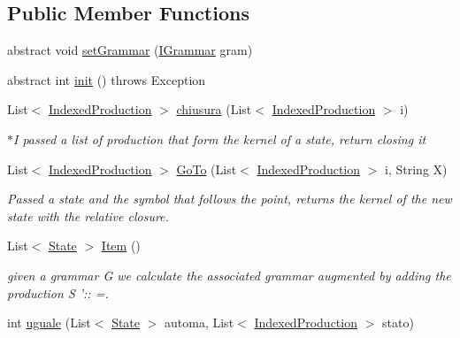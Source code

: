 \subsection*{Public Member Functions}
\begin{DoxyCompactItemize}
\item 
abstract void \hyperlink{classcontext_free_1_1parser_1_1_l_r0_ab87079bb387c26bad40d3678e80eefc9}{set\-Grammar} (\hyperlink{interfacecontext_free_1_1grammar_1_1_i_grammar}{I\-Grammar} gram)
\item 
abstract int \hyperlink{classcontext_free_1_1parser_1_1_l_r0_a1936c0d9c7c80de80a5b3913f8f710b7}{init} ()  throws Exception
\item 
List$<$ \hyperlink{classcontext_free_1_1parser_1_1_indexed_production}{Indexed\-Production} $>$ \hyperlink{classcontext_free_1_1parser_1_1_l_r0_aa0e8369b6e2db7489437ad8a6f217d22}{chiusura} (List$<$ \hyperlink{classcontext_free_1_1parser_1_1_indexed_production}{Indexed\-Production} $>$ i)
\begin{DoxyCompactList}\small\item\em $\ast$\-I passed a list of production that form the kernel of a state, return closing it \end{DoxyCompactList}\item 
List$<$ \hyperlink{classcontext_free_1_1parser_1_1_indexed_production}{Indexed\-Production} $>$ \hyperlink{classcontext_free_1_1parser_1_1_l_r0_aea1ecb06a1880a8bc5eeb4efcca0ecea}{Go\-To} (List$<$ \hyperlink{classcontext_free_1_1parser_1_1_indexed_production}{Indexed\-Production} $>$ i, String X)
\begin{DoxyCompactList}\small\item\em Passed a state and the symbol that follows the point, returns the kernel of the new state with the relative closure. \end{DoxyCompactList}\item 
List$<$ \hyperlink{classcontext_free_1_1parser_1_1_state}{State} $>$ \hyperlink{classcontext_free_1_1parser_1_1_l_r0_aa96d752420b690ccbbc9fad67691f36a}{Item} ()
\begin{DoxyCompactList}\small\item\em given a grammar G we calculate the associated grammar augmented by adding the production S '\-:\-: =. \end{DoxyCompactList}\item 
int \hyperlink{classcontext_free_1_1parser_1_1_l_r0_a8de929e041a5a1a273e6ddd05dc7e0ca}{uguale} (List$<$ \hyperlink{classcontext_free_1_1parser_1_1_state}{State} $>$ automa, List$<$ \hyperlink{classcontext_free_1_1parser_1_1_indexed_production}{Indexed\-Production} $>$ stato)

\end{DoxyCompactItemize}

